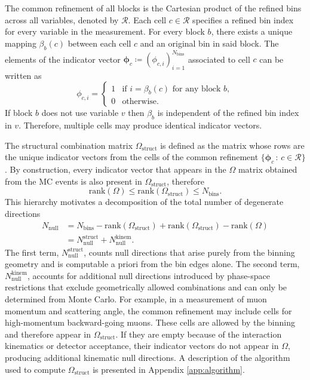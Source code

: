 \documentclass[a4paper,11pt]{article}
\begin{document}
The common refinement of all blocks is the Cartesian product of the refined bins across all variables, denoted by $\mathcal{R}$. Each cell $c \in \mathcal{R}$ specifies a refined bin index for every variable in the measurement. For every block $b$, there exists a unique mapping $\beta_{b}(c)$ between each cell $c$ and an original bin in said block. The elements of the indicator vector $\boldsymbol{\phi}_{c} \coloneqq (\phi_{c,i})_{i=1}^{N_{\text{bins}}}$ associated to cell $c$ can be written as
\begin{equation}
    \phi_{c,i} = \begin{cases}
        1 & \text{if } i = \beta_b(c) \text{ for any block } b, \\
        0 & \text{otherwise.}
    \end{cases}
\end{equation}
If block $b$ does not use variable $v$ then $\beta_{b}$ is independent of the refined bin index in $v$. Therefore, multiple cells may produce identical indicator vectors.

The structural combination matrix $\Omega_{\text{struct}}$ is defined as the matrix whose rows are the unique indicator vectors from the cells of the common refinement $\{\boldsymbol{\phi}_{c} \, : \, c \in \mathcal{R}\}$. By construction, every indicator vector that appears in the $\Omega$ matrix obtained from the MC events is also present in $\Omega_{\text{struct}}$, therefore
\begin{equation}\label{eq:hierarchy}
    \mathrm{rank}(\Omega) \leq \mathrm{rank}(\Omega_{\text{struct}}) \leq N_{\text{bins}}.
\end{equation}
This hierarchy motivates a decomposition of the total number of degenerate directions
\begin{equation}
    \begin{split}
        N_{\text{null}} &= N_{\text{bins}} - \mathrm{rank}(\Omega_{\text{struct}}) + \mathrm{rank}(\Omega_{\text{struct}}) - \mathrm{rank}(\Omega)\\
        &= N_{\text{null}}^{\text{struct}} + N_{\text{null}}^{\text{kinem}}.
    \end{split}    
\end{equation}
The first term, $N_{\text{null}}^{\text{struct}}$, counts null directions that arise purely from the binning geometry and is computable a priori from the bin edges alone. The second term, $N_{\text{null}}^{\text{kinem}}$, accounts for additional null directions introduced by phase-space restrictions that exclude geometrically allowed combinations and can only be determined from Monte Carlo. For example, in a measurement of muon momentum and scattering angle, the common refinement may include cells for high-momentum backward-going muons. These cells are allowed by the binning and therefore appear in $\Omega_{\text{struct}}$. If they are empty because of the interaction kinematics or detector acceptance, their indicator vectors do not appear in $\Omega$, producing additional kinematic null directions. A description of the algorithm used to compute $\Omega_{\text{struct}}$ is presented in Appendix \ref{app:algorithm}.
\end{document}
